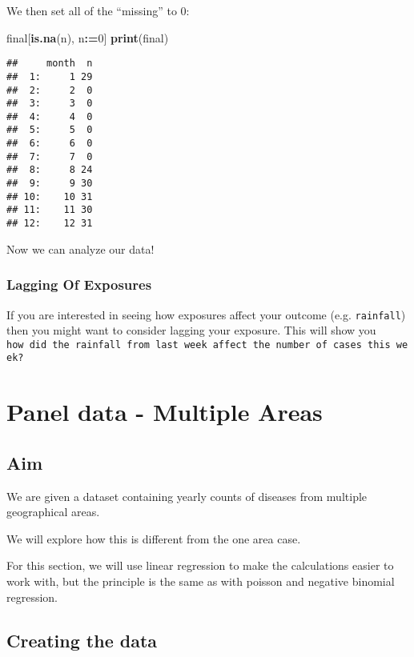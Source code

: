 \documentclass[]{book}
\newenvironment{Shaded}{\begin{snugshade}}{\end{snugshade}}
\newcommand{\KeywordTok}[1]{\textcolor[rgb]{0.13,0.29,0.53}{\textbf{#1}}}
\newcommand{\DecValTok}[1]{\textcolor[rgb]{0.00,0.00,0.81}{#1}}
\newcommand{\OperatorTok}[1]{\textcolor[rgb]{0.81,0.36,0.00}{\textbf{#1}}}
\newcommand{\ErrorTok}[1]{\textcolor[rgb]{0.64,0.00,0.00}{\textbf{#1}}}
\newcommand{\NormalTok}[1]{#1}
\begin{document}
We then set all of the ``missing'' to 0:

\begin{Shaded}
\begin{Highlighting}[]
\NormalTok{final[}\KeywordTok{is.na}\NormalTok{(n), n}\OperatorTok{:}\ErrorTok{=}\DecValTok{0}\NormalTok{]}
\KeywordTok{print}\NormalTok{(final)}
\end{Highlighting}
\end{Shaded}

\begin{verbatim}
##     month  n
##  1:     1 29
##  2:     2  0
##  3:     3  0
##  4:     4  0
##  5:     5  0
##  6:     6  0
##  7:     7  0
##  8:     8 24
##  9:     9 30
## 10:    10 31
## 11:    11 30
## 12:    12 31
\end{verbatim}

Now we can analyze our data!

\subsection{Lagging Of Exposures}\label{lagging-of-exposures}

If you are interested in seeing how exposures affect your outcome (e.g.
\texttt{rainfall}) then you might want to consider lagging your
exposure. This will show you
\texttt{how\ did\ the\ rainfall\ from\ last\ week\ affect\ the\ number\ of\ cases\ this\ week?}

\chapter{Panel data - Multiple Areas}\label{panel-data---multiple-areas}

\section{Aim}\label{aim-1}

We are given a dataset containing yearly counts of diseases from
multiple geographical areas.

We will explore how this is different from the one area case.

For this section, we will use linear regression to make the calculations
easier to work with, but the principle is the same as with poisson and
negative binomial regression.

\section{Creating the data}\label{creating-the-data}
\end{document}
